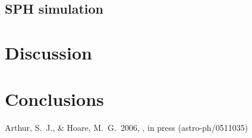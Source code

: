 \documentclass[proceedings, preprint]{rmaa}
\begin{document}
\subsection{SPH simulation}



\section{Discussion}

\section{Conclusions}

\begin{thebibliography}
 Arthur, S.~J., \&
Hoare, M.~G.\ 2006, \apj, in press (astro-ph/0511035)

\end{thebibliography}
\end{document}
